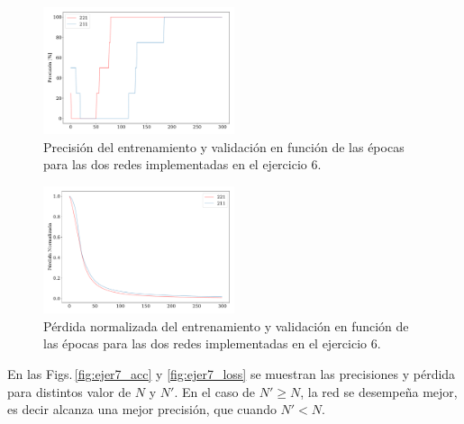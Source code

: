 \begin{figure}[H]
    \begin{small}
        \begin{center}
            \includegraphics[width=0.5\textwidth]{Graphs/ejer6_acc.pdf}
        \end{center}
        \caption{Precisión del entrenamiento  y validación en función de las épocas para las dos redes implementadas en el ejercicio 6.}
        \label{fig:ejer6_acc}
    \end{small}
\end{figure}


\begin{figure}[H]
    \begin{small}
        \begin{center}
            \includegraphics[width=0.5\textwidth]{Graphs/ejer6_loss.pdf}
        \end{center}
        \caption{Pérdida normalizada del entrenamiento  y validación en función de las épocas para las dos redes implementadas en el ejercicio 6.}
        \label{fig:ejer6_loss}
    \end{small}
\end{figure}


En las Figs.\,\ref{fig:ejer7_acc} y \ref{fig:ejer7_loss} se muestran las precisiones y pérdida para distintos valor de $N$ y $N'$.  En el caso de $N'\geq N$, la red se desempeña mejor, es decir alcanza una mejor precisión,  que cuando $N'<N$.


